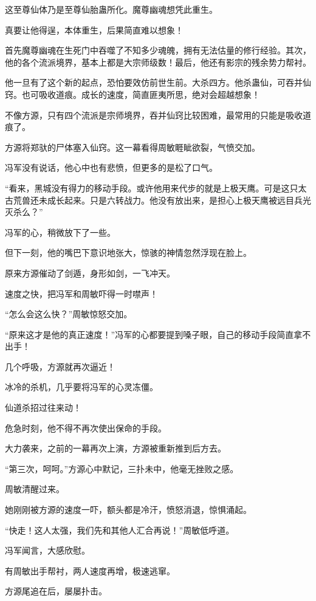 \begin{this_body}
这至尊仙体乃是至尊仙胎蛊所化。魔尊幽魂想凭此重生。

真要让他得逞，本体重生，后果简直难以想象！

首先魔尊幽魂在生死门中吞噬了不知多少魂魄，拥有无法估量的修行经验。其次，他的各个流派境界，基本上都是大宗师级数！最后，他还有影宗的残余势力帮衬。

他一旦有了这个新的起点，恐怕要效仿前世生前。大杀四方。他杀蛊仙，可吞并仙窍。也可吸收道痕。成长的速度，简直匪夷所思，绝对会超越想象！

不像方源，只有四个流派是宗师境界，吞并仙窍比较困难，最常用的只能是吸收道痕了。

方源将郑驮的尸体塞入仙窍。这一幕看得周敏睚眦欲裂，气愤交加。

冯军没有说话，他心中也有悲愤，但更多的是松了口气。

“看来，黑城没有得力的移动手段。或许他用来代步的就是上极天鹰。可是这只太古荒兽还未成长起来。只是六转战力。他没有放出来，是担心上极天鹰被远目兵光灭杀么？”

冯军的心，稍微放下了一些。

但下一刻，他的嘴巴下意识地张大，惊骇的神情忽然浮现在脸上。

原来方源催动了剑遁，身形如剑，一飞冲天。

速度之快，把冯军和周敏吓得一时噤声！

“怎么会这么快？”周敏惊怒交加。

“原来这才是他的真正速度！”冯军的心都要提到嗓子眼，自己的移动手段简直拿不出手！

几个呼吸，方源就再次逼近！

冰冷的杀机，几乎要将冯军的心灵冻僵。

仙道杀招过往来动！

危急时刻，他不得不再次使出保命的手段。

大力袭来，之前的一幕再次上演，方源被重新推到后方去。

“第三次，呵呵。”方源心中默记，三扑未中，他毫无挫败之感。

周敏清醒过来。

她刚刚被方源的速度一吓，额头都是冷汗，愤怒消退，惊惧涌起。

“快走！这人太强，我们先和其他人汇合再说！”周敏低呼道。

冯军闻言，大感欣慰。

有周敏出手帮衬，两人速度再增，极速逃窜。

方源尾追在后，屡屡扑击。


\end{this_body}
